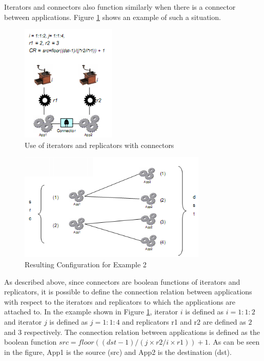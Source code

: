 Iterators and connectors also function similarly when there is a connector between applications. Figure \ref{fig:iterator-connector} shows an example of such a situation. 

\begin{figure}
	\centering
		\includegraphics[width=0.40\textwidth]{figures/iterator-connector.png}
	\caption{Use of iterators and replicators with connectors}
	\label{fig:iterator-connector}
\end{figure}

\begin{figure}
	\centering
		\includegraphics[width=0.80\textwidth]{figures/iterator-connector2.png}
	\caption{Resulting Configuration for Example 2}
	\label{fig:iterator-connector2}
\end{figure}

As described above, since connectors are boolean functions of iterators and replicators, it is possible to define the connection relation between applications with respect to the iterators and replicators to which the applications are attached to. In the example shown in Figure \ref{fig:iterator-connector}, iterator $i$ is defined as $i = 1:1:2$ and iterator $j$ is defined as $j = 1:1:4$ and replicators r1 and r2 are defined as $2$ and $3$ respectively. The connection relation between applications is defined as the boolean function $src = floor((dst-1)/(j \times r2 / i \times r1)) + 1$. As can be seen in the figure, App1 is the source (src) and App2 is the destination (dst). 

